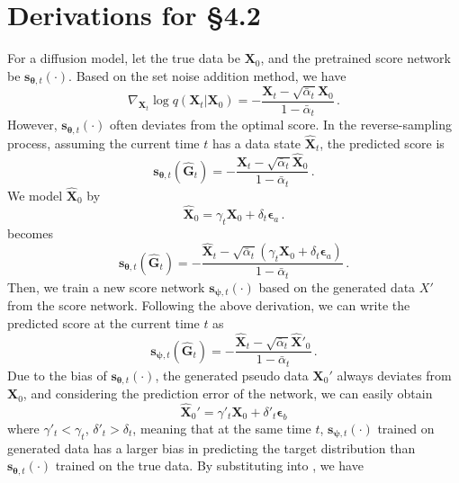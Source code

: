 \documentclass{article}
\newcommand{\s}{{{\bm s}}}
\newcommand{\X}{{{\bm X}}}
\newcommand{\G}{{{\bm G}}}
\newcommand{\EPS}{{\bm\epsilon}}
\newcommand{\THETA}{{\bm\theta}}
\newcommand{\PSI}{{\bm\psi}}
\begin{document}
\section{Derivations for 
\S4.2}\label{appendix:C.Derivation of section 4.2}
For a diffusion model, let the true data be $\X_0$, and the pretrained score network be $\s_{\THETA,t}(\cdot)$. Based on the set noise addition method, we have
\begin{equation}
\nabla_{\X_t}\log q(\X_t|\X_0)=-\frac{\X_t-\sqrt{\bar{\alpha}_t}\X_0}{{1-\bar{\alpha}_t}}\,.
\label{eq:ideal_score}
\end{equation}
However, $\s_{\THETA,t}(\cdot)$ often deviates from the optimal score. In the reverse-sampling process, assuming the current time $t$ has a data state $\hat{\X}_t$, the predicted score is
\begin{equation}
\s_{\THETA,t}(\hat{\G}_t)=-\frac{\hat{\X}_t-\sqrt{\bar{\alpha}_t}\hat{\X}_0}{{1-\bar{\alpha}_t}}\,.\tag{6}
\label{eq:predicted_score}
\end{equation}
We model $\hat{\X}_0$ by
\begin{equation}
\hat{\X}_0=\gamma_t\X_0+\delta_t\EPS_a\,.\tag{8}
\label{eq:x0_model}
\end{equation}
 becomes
\begin{equation}
\s_{\THETA,t}(\hat{\G}_t)=-\frac{\hat{\X}_t-\sqrt{\bar{\alpha}_t}(\gamma_t\X_0+\delta_t\EPS_a)}{{1-\bar{\alpha}_t}}\,.
\label{eq:modified_score}
\end{equation}
Then, we train a new score network $\s_{\PSI,t}(\cdot)$ based on the generated data $X'$ from the score network. Following the above derivation, we can write the predicted score at the current time $t$ as
\begin{equation}
\s_{\PSI,t}(\hat{\G}_t)=-\frac{\hat{\X}_t-\sqrt{\bar{\alpha}_t}\hat{\X}'_0}{{1-\bar{\alpha}_t}}\,.
\label{eq:new_score}
\end{equation}
Due to the bias of $\s_{\THETA,t}(\cdot)$, the generated pseudo data $\X_0'$ always deviates from $\X_0$, and considering the prediction error of the network, we can easily obtain
\begin{equation}
\hat{\X}_0'=\gamma'_t\X_0+\delta'_t\EPS_b
\label{eq:x0_tilde_model}
\end{equation}
where $\gamma'_t < \gamma_t$, $\delta'_t > \delta_t$, meaning that at the same time $t$, $\s_{\PSI,t}(\cdot)$ trained on generated data has a larger bias in predicting the target distribution than $\s_{\THETA,t}(\cdot)$ trained on the true data. By substituting  into , we have
\end{document}
